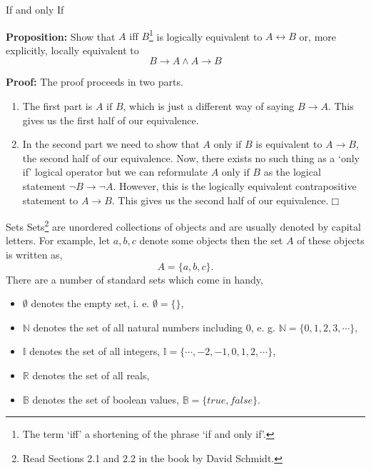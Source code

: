 \documentclass{beamer}
\begin{document}
\begin{frame}{If and only If}

{\bf Proposition:} Show that $A \mbox{ iff } B$\footnote{The term `iff' a shortening of the phrase `if and only if'.} is logically equivalent to $A\leftrightarrow B$ or, more explicitly, locally equivalent to
\[
B\rightarrow A \wedge A\rightarrow B
\]

\vspace{.1in}
{\bf Proof:} The proof proceeds in two parts.  
\begin{enumerate}
\item
The first part is $A \mbox{ if } B$, which is just a 
different way of saying $B\rightarrow A$.   This gives us the first half of our equivalence.

\item
In the second part we need to show that $A \mbox{ only if }B$ is  equivalent to $A\rightarrow B$, the second half of our equivalence.  Now, there exists no such thing as a `only if' logical operator but we can reformulate $A \mbox{ only if }B$ as the logical statement $\neg B \rightarrow \neg A$.
However, this is the logically equivalent contrapositive statement to $A\rightarrow B$.
This gives us the second half of our equivalence.$\Box$


\end{enumerate}
\end{frame}
\begin{frame}{Sets}
Sets\footnote{\tiny Read Sections 2.1 and 2.2 in the book by David Schmidt.}
 are unordered collections of objects and are usually denoted by capital letters.  For example,
let $a,b,c$ denote some objects then the set $A$ of these objects is written as,
\[
A = \{a,b,c\}.
\]
There are a number of standard sets which come in handy,
\begin{itemize}
\item $\emptyset$ denotes the empty set, i. e. $\emptyset = \{ \}$,
\item $\mathbb N$ denotes the set of all natural numbers including 0, e. g. ${\mathbb N} = \{0,1,2,3,\cdots\}$,
\item $\mathbb I$ denotes the set of all integers, ${\mathbb I}= \{\cdots,-2,-1,0,1,2,\cdots\}$,
\item $\mathbb R$ denotes the set of all reals,
\item $\mathbb B$ denotes the set of boolean values, ${\mathbb B} = \{\mathit{true}, \mathit{false} \}$.
\end{itemize}
\end{frame}
\end{document}
